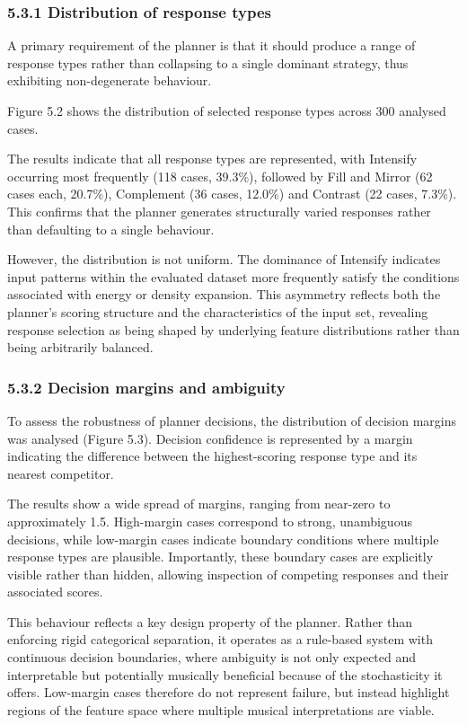 \subsubsection{5.3.1 Distribution of response
types}\label{distribution-of-response-types}

A primary requirement of the planner is that it should produce a range
of response types rather than collapsing to a single dominant strategy,
thus exhibiting non-degenerate behaviour.

Figure 5.2 shows the distribution of selected response types across 300
analysed cases.

The results indicate that all response types are represented, with
Intensify occurring most frequently (118 cases, 39.3\%), followed by
Fill and Mirror (62 cases each, 20.7\%), Complement (36 cases, 12.0\%)
and Contrast (22 cases, 7.3\%). This confirms that the planner generates
structurally varied responses rather than defaulting to a single
behaviour.

However, the distribution is not uniform. The dominance of Intensify
indicates input patterns within the evaluated dataset more frequently
satisfy the conditions associated with energy or density expansion. This
asymmetry reflects both the planner's scoring structure and the
characteristics of the input set, revealing response selection as being
shaped by underlying feature distributions rather than being arbitrarily
balanced.

\subsubsection{5.3.2 Decision margins and
ambiguity}\label{decision-margins-and-ambiguity}

To assess the robustness of planner decisions, the distribution of
decision margins was analysed (Figure 5.3). Decision confidence is
represented by a margin indicating the difference between the
highest-scoring response type and its nearest competitor.

The results show a wide spread of margins, ranging from near-zero to
approximately 1.5. High-margin cases correspond to strong, unambiguous
decisions, while low-margin cases indicate boundary conditions where
multiple response types are plausible. Importantly, these boundary cases
are explicitly visible rather than hidden, allowing inspection of
competing responses and their associated scores.

This behaviour reflects a key design property of the planner. Rather
than enforcing rigid categorical separation, it operates as a rule-based
system with continuous decision boundaries, where ambiguity is not only
expected and interpretable but potentially musically beneficial because
of the stochasticity it offers. Low-margin cases therefore do not
represent failure, but instead highlight regions of the feature space
where multiple musical interpretations are viable.

